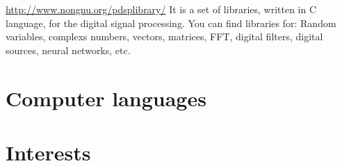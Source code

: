 \documentclass[11pt,a4paper,sans]{moderncv} %
\begin{document}
		

			{\url{http://www.nongnu.org/pdsplibrary/}}
			{}{}
			{It is a set of libraries, written in C language, for 
			the digital signal processing. You can find libraries for:
			Random variables, complexs numbers, vectors, matrices, FFT,
			digital filters, digital sources, neural networks, etc.}



\section{Computer languages}



\section{Interests}

\renewcommand{\listitemsymbol}{-~} %
\end{document}
